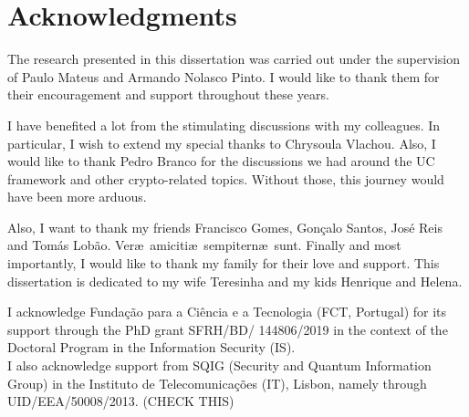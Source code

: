 

\chapter*{Acknowledgments}

The research presented in this dissertation was carried out under the supervision of Paulo Mateus and Armando Nolasco Pinto. I would like to thank them for their encouragement and support throughout these years.

I have benefited a lot from the stimulating discussions with my colleagues. In particular, I wish to extend my special thanks to Chrysoula Vlachou. Also, I would like to thank Pedro Branco for the discussions we had around the UC framework and other crypto-related topics. Without those, this journey would have been more arduous.

Also, I want to thank my friends Francisco Gomes, Gonçalo Santos, José Reis and Tomás Lobão. Ver\ae\ amiciti\ae\ sempitern\ae\ sunt. Finally and most importantly, I would like to thank my family for their love and support. This dissertation is dedicated to my wife Teresinha and my kids Henrique and Helena.

\vfill
\begin{center}\begin{footnotesize}
I acknowledge Funda\c{c}\~{a}o para a Ci\^{e}ncia e a Tecnologia (FCT, Portugal) for its support through the PhD grant SFRH/BD/ 144806/2019 in the context of the Doctoral Program in the Information Security (IS).\\
I also acknowledge support from SQIG (Security and Quantum Information Group) in the Instituto de Telecomunica\c{c}\~{o}es (IT), Lisbon, namely through UID/EEA/50008/2013. {\cv(CHECK THIS)}
\end{footnotesize}
\end{center}

